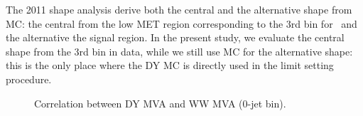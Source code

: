 The 2011 shape analysis derive both the central and the alternative shape from MC: the central from the low MET region corresponding to the 3rd bin for \routin\ 
and the alternative the signal region. 
In the present study, we evaluate the central shape from the 3rd bin in data, while we still use MC for the alternative shape: 
this is the only place where the DY MC is directly used in the limit setting procedure.

\begin{figure}[!hbtp]
\begin{center}
\caption{Correlation between DY MVA and WW MVA (0-jet bin).}
\label{fig:wwmvacorr0j}
\end{center}
\end{figure}

